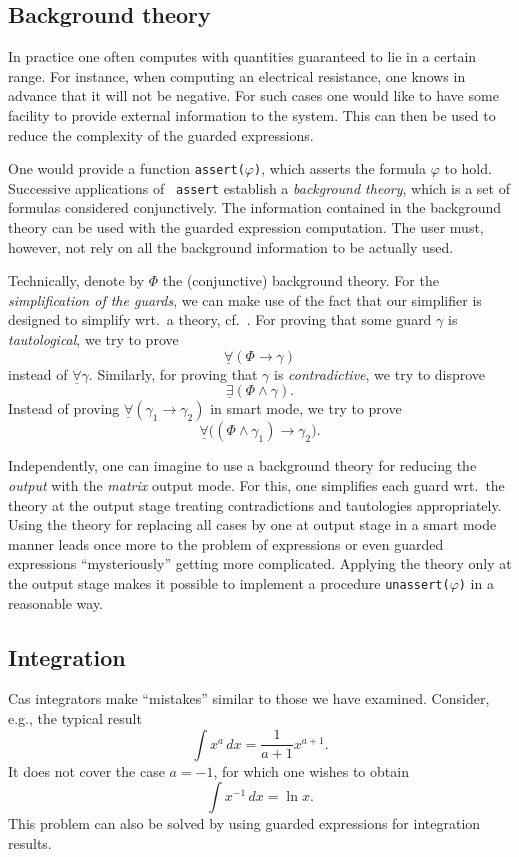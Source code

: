 \subsection{Background theory}\label{background}
In practice one often computes with quantities guaranteed to lie in a
certain range. For instance, when computing an electrical resistance,
one knows in advance that it will not be negative. For such cases one
would like to have some facility to provide external information to
the system. This can then be used to reduce the complexity of the
guarded expressions.

One would provide a function {\tt assert($\varphi$)}, which asserts
the formula {\tt $\varphi$} to hold. Successive applications of {\tt
assert} establish a {\em background theory}, which is a set of
formulas considered conjunctively. The information contained in the
background theory can be used with the guarded expression computation.
The user must, however, not rely on all the background information to
be actually used.

Technically, denote by $\Phi$ the (conjunctive) background theory. For
the {\em simplification of the guards}, we can make use of the fact
that our simplifier is designed to simplify wrt.~a theory,
cf.~\cite{DolzmannSturm:95}. For proving that some guard $\gamma$ is
{\em tautological}, we try to prove
$$\underline{\forall}(\Phi\longrightarrow\gamma)$$ instead of
$\underline{\forall}\gamma$. Similarly, for proving that $\gamma$ is
{\em contradictive}, we try to disprove
$$\underline{\exists}(\Phi\land\gamma).$$ Instead of proving
$\underline{\forall}(\gamma_1\longrightarrow\gamma_2)$ in smart mode, we try to
prove
$$\underline{\forall}\bigl((\Phi\land\gamma_1)\longrightarrow\gamma_2\bigr).$$

Independently, one can imagine to use a background theory for reducing
the {\em output} with the {\em matrix} output mode. For this, one
simplifies each guard wrt.~the theory at the output stage treating
contradictions and tautologies appropriately. Using the theory for
replacing all cases by one at output stage in a smart mode manner
leads once more to the problem of expressions or even guarded
expressions ``mysteriously'' getting more complicated. Applying the
theory only at the output stage makes it possible to implement a
procedure {\tt unassert($\varphi$)} in a reasonable way.
%
\subsection{Integration}\label{integration}
{\sc Cas} integrators make ``mistakes'' similar to those we have
examined. Consider, e.g., the typical result
$$
\int x^a\,dx=\frac{1}{a+1}x^{a+1}.
$$
It does not cover the case $a=-1$, for which one wishes to obtain
$$
\int x^{-1}\,dx=\ln x.
$$
This problem can also be solved by using guarded expressions for
integration results.

